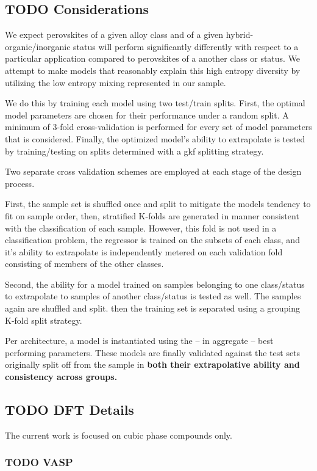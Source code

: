 \documentclass[aip, jmp, amsmath, amssymb]{revtex4-2}
\begin{document}
\subsection*{{\bfseries\sffamily TODO} Considerations}
\label{sec:org1ab9a6f}
We expect perovskites of a given alloy class and of a given
hybrid-organic/inorganic status will perform significantly differently
with respect to a particular application compared to perovskites of a
another class or status. We attempt to make models that reasonably
explain this high entropy diversity by utilizing the low entropy
mixing represented in our sample.

We do this by training each model using two test/train splits. First,
the optimal model parameters are chosen for their performance under a
random split. A minimum of 3-fold cross-validation is performed for
every set of model parameters that is considered. Finally, the
optimized model's ability to extrapolate is tested by training/testing
on splits determined with a \gls{gkf} splitting strategy.

Two separate cross validation schemes are employed at each stage of
the design process.

First, the sample set is shuffled once and split to mitigate the
models tendency to fit on sample order, then, stratified K-folds are
generated in manner consistent with the classification of each
sample. However, this fold is not used in a classification problem,
the regressor is trained on the subsets of each class, and it's
ability to extrapolate is independently metered on each validation
fold consisting of members of the other classes.

Second, the ability for a model trained on samples belonging to one
class/status to extrapolate to samples of another class/status is
tested as well. The samples again are shuffled and split. then the
training set is separated using a grouping K-fold split strategy.

Per architecture, a model is instantiated using the -- in aggregate --
best performing parameters. These models are finally validated against
the test sets originally split off from the sample in \textbf{both their
extrapolative ability and consistency across groups.}
\subsection*{{\bfseries\sffamily TODO} DFT Details}
\label{sec:org6ef3da4}
The current work is focused on cubic phase compounds only.
\subsubsection*{{\bfseries\sffamily TODO} VASP}
\label{sec:org7ecd60a}
\end{document}
